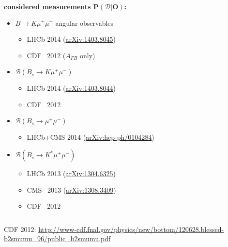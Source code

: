 \documentclass[english]{beamer}
\newcommand{\slide}[2][t]{\begin{frame}[#1] \frametitle{\insertsection} #2 \end{frame}}
\begin{document}
\slide[c]{

    \frametitle{\insertsubsectionhead}

    {\large\textbf{considered measurements $ \boldsymbol{P\left(\mathcal{D} | \boldsymbol{O} \right)} $:}}

    \begin{itemize}
        \item $B\rightarrow K\mu^+\mu^-$ angular observables
        \begin{itemize}
            \item LHCb 2014 (\href{http://arXiv.org/abs/1403.8045}{arXiv:1403.8045})
            \item CDF~ 2012 ($A_{FB}$ only)
        \end{itemize}
        \item $\mathcal{B}(B_s\rightarrow{}K\mu^+\mu^-)$
        \begin{itemize}
            \item LHCb 2014 ({\href{http://arXiv.org/abs/1403.8044}{arXiv:1403.8044}})
            \item CDF~ 2012
        \end{itemize}
        \item $\mathcal{B}(B_s\rightarrow\mu^+\mu^-)$
        \begin{itemize}
            \item LHCb+CMS 2014 ({\href{http://arXiv.org/abs/hep-ph/0104284}{arXiv:hep-ph/0104284}})
        \end{itemize}
        \item $\mathcal{B}(B_s\rightarrow K^\ast\mu^+\mu^-)$
        \begin{itemize}
            \item LHCb 2013 ({\href{http://arXiv.org/abs/1304.6325}{arXiv:1304.6325}})
            \item CMS~ 2013 ({\href{http://arXiv.org/abs/1308.3409}{arXiv:1308.3409}})
            \item CDF~ 2012
        \end{itemize}
    \end{itemize}

    \vspace{3mm}

    \begin{columns}[t]
        \column{.165\textwidth}
            CDF 2012:
        \column{.835\textwidth}
            {\url{http://www-cdf.fnal.gov/physics/new/bottom/120628.blessed-b2smumu_96/public_b2smumu.pdf}}
    \end{columns}
}
\end{document}
